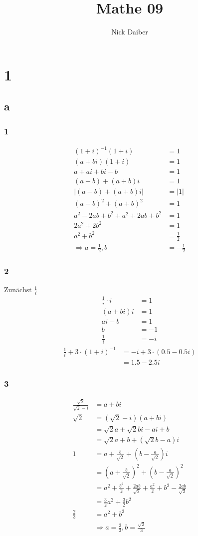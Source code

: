 \documentclass{article}
\author{Nick Daiber}
\title{Mathe 09}
\begin{document}
\section*{1}
\subsection*{a}
\subsubsection*{1}
\begin{align*}
    (1+i)^{-1}(1+i)&=1\\
    (a+bi)(1+i)&=1\\
    a+ai+bi-b&=1\\
    (a-b)+(a+b)i&=1\\
    |(a-b)+(a+b)i|&=|1|\\
    (a-b)^2+(a+b)^2&=1\\
    a^2-2ab+b^2+a^2+2ab+b^2&=1\\
    2a^2+2b^2&=1\\
    a^2+b^2&=\frac{1}{2}\\
    \Rightarrow a=\frac{1}{2},b&=-\frac{1}{2}
\end{align*}
\subsubsection*{2}
Zunächst $\frac{1}{i}$
\begin{align*}
    \frac{1}{i}\cdot i&=1\\
    (a+bi)i&=1\\
    ai-b&=1\\
    b&=-1\\
    \frac{1}{i}&=-i
\end{align*}
\begin{align*}
    \frac{1}{i}+3\cdot (1+i)^{-1}&=-i + 3 \cdot (0.5-0.5i)\\
    &=1.5-2.5i
\end{align*}
\subsubsection*{3}
\begin{align*}
    \frac{\sqrt{2}}{\sqrt{2}-i}&=a+bi\\
    \sqrt{2}&=(\sqrt{2}-i)(a+bi)\\
    &=\sqrt{2}a+\sqrt{2}bi-ai+b\\
    &=\sqrt{2}a+b+(\sqrt{2}b-a)i\\
    1&=a+\frac{b}{\sqrt{2}}+(b-\frac{a}{\sqrt{2}})i\\
    &=(a+\frac{b}{\sqrt{2}})^2+(b-\frac{a}{\sqrt{2}})^2\\
    &=a^2+\frac{b^2}{2}+\frac{2ab}{\sqrt{2}}+\frac{a^2}{2}+b^2-\frac{2ab}{\sqrt{2}}\\
    &=\frac{3}{2}a^2+ \frac{3}{2}b^2\\
    \frac{2}{3}&=a^2+b^2\\
    &\Rightarrow a=\frac{2}{3}, b=\frac{\sqrt{2}}{3}
\end{align*}
\end{document}
